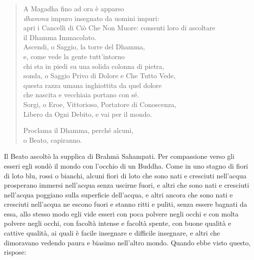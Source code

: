 \begin{quote}
A Magadha fino ad ora è apparso \\
\emph{dhamma} impuro insegnato da uomini impuri: \\
apri i Cancelli di Ciò Che Non Muore: consenti loro di ascoltare \\
il Dhamma Immacolato. \\
Ascendi, o Saggio, la torre del Dhamma, \\
e, come vede la gente tutt’intorno \\
chi sta in piedi su una solida colonna di pietra, \\
sonda, o Saggio Privo di Dolore e Che Tutto Vede, \\
questa razza umana inghiottita da quel dolore \\
che nascita e vecchiaia portano con sé. \\
Sorgi, o Eroe, Vittorioso, Portatore di Conoscenza, \\
Libero da Ogni Debito, e vai per il mondo.

Proclama il Dhamma, perché alcuni, \\
o Beato, capiranno.
\end{quote}

Il Beato ascoltò la supplica di Brahmā Sahampati. Per compassione verso gli
esseri egli sondò il mondo con l’occhio di un Buddha. Come in uno stagno di
fiori di loto blu, rossi o bianchi, alcuni fiori di loto che sono nati e
cresciuti nell’acqua prosperano immersi nell’acqua senza uscirne fuori, e altri
che sono nati e cresciuti nell’acqua poggiano sulla superficie dell’acqua, e
altri ancora che sono nati e cresciuti nell’acqua ne escono fuori e stanno ritti
e puliti, senza essere bagnati da essa, allo stesso modo egli vide esseri con
poca polvere negli occhi e con molta polvere negli occhi, con facoltà intense e
facoltà spente, con buone qualità e cattive qualità, ai quali è facile insegnare
e difficile insegnare, e altri che dimoravano vedendo paura e biasimo nell’altro
mondo. Quando ebbe visto questo, rispose:

